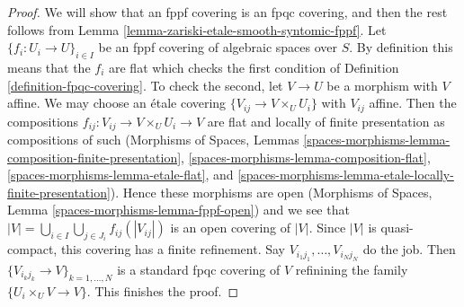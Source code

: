 \documentclass{stacks-project}
\theoremstyle{plain}
\theoremstyle{definition}
\theoremstyle{remark}
\numberwithin{equation}{subsection}
\begin{document}
\begin{proof}
We will show that an fppf covering is an fpqc covering, and then the
rest follows from
Lemma \ref{lemma-zariski-etale-smooth-syntomic-fppf}.
Let $\{f_i : U_i \to U\}_{i \in I}$ be an
fppf covering of algebraic spaces over $S$.
By definition this means that the $f_i$ are flat which checks the first
condition of Definition \ref{definition-fpqc-covering}. To check the
second, let $V \to U$ be a morphism with $V$ affine.
We may choose an \'etale covering $\{V_{ij} \to V \times_U U_i\}$
with $V_{ij}$ affine. Then the compositions
$f_{ij} : V_{ij} \to V \times_U U_i \to V$ are flat and locally of
finite presentation as compositions of such
(Morphisms of Spaces, Lemmas
\ref{spaces-morphisms-lemma-composition-finite-presentation},
\ref{spaces-morphisms-lemma-composition-flat},
\ref{spaces-morphisms-lemma-etale-flat}, and
\ref{spaces-morphisms-lemma-etale-locally-finite-presentation}).
Hence these morphisms are open
(Morphisms of Spaces, Lemma \ref{spaces-morphisms-lemma-fppf-open})
and we see that
$|V| = \bigcup_{i \in I} \bigcup_{j \in J_i} f_{ij}(|V_{ij}|)$
is an open covering of $|V|$.
Since $|V|$ is quasi-compact, this covering has a finite
refinement.
Say $V_{i_1j_1}, \ldots, V_{i_Nj_N}$ do the job.
Then $\{V_{i_kj_k} \to V\}_{k = 1, \ldots, N}$ is
a standard fpqc covering of $V$ refinining the family
$\{U_i \times_U V \to V\}$.
This finishes the proof.
\end{proof}
\end{document}
